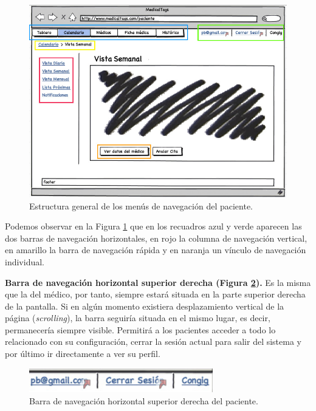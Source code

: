 		\begin{figure}[H]
		  \centering
		    \includegraphics[width=15cm]{img/jpg/nav/paciente.jpg}
		  \caption{Estructura general de los menús de navegación del paciente.}
		  \label{fig:nav_paciente}
		\end{figure}
		
		Podemos observar en la Figura \ref{fig:nav_paciente} que en los recuadros azul y verde aparecen las dos barras de navegación horizontales, en rojo la columna de navegación vertical, en amarillo la barra de navegación rápida y en naranja un vínculo de navegación individual.
		
		\textbf{Barra de navegación horizontal superior derecha (Figura \ref{fig:nav_paciente_sup2}).} Es la misma que la del médico, por tanto, siempre estará situada en la parte superior derecha de la pantalla. Si en algún momento existiera desplazamiento vertical de la página (\textit{scrolling}), la barra seguiría situada en el mismo lugar, es decir, permanecería siempre visible. Permitirá a los pacientes acceder a todo lo relacionado con su configuración, cerrar la sesión actual para salir del sistema y por último ir directamente a ver su perfil.
		
		\begin{figure}[H]
		  \centering
		    \includegraphics[width=8cm]{img/jpg/nav/medico_sup2.jpg}
		  \caption{Barra de navegación horizontal superior derecha del paciente.}
		  \label{fig:nav_paciente_sup2}
		\end{figure}
		
